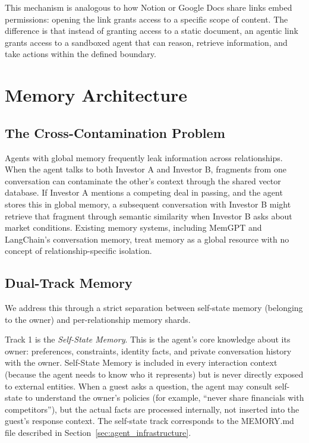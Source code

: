 \documentclass[11pt]{article}
\begin{document}
This mechanism is analogous to how Notion or Google Docs share links embed permissions: opening the link grants access to a specific scope of content. The difference is that instead of granting access to a static document, an agentic link grants access to a sandboxed agent that can reason, retrieve information, and take actions within the defined boundary.


\section{Memory Architecture}
\label{sec:memory_architecture}

\subsection{The Cross-Contamination Problem}

Agents with global memory frequently leak information across relationships. When the agent talks to both Investor A and Investor B, fragments from one conversation can contaminate the other's context through the shared vector database. If Investor A mentions a competing deal in passing, and the agent stores this in global memory, a subsequent conversation with Investor B might retrieve that fragment through semantic similarity when Investor B asks about market conditions. Existing memory systems, including MemGPT and LangChain's conversation memory, treat memory as a global resource with no concept of relationship-specific isolation.

\subsection{Dual-Track Memory}

We address this through a strict separation between self-state memory (belonging to the owner) and per-relationship memory shards.

Track 1 is the \emph{Self-State Memory}. This is the agent's core knowledge about its owner: preferences, constraints, identity facts, and private conversation history with the owner. Self-State Memory is included in every interaction context (because the agent needs to know who it represents) but is never directly exposed to external entities. When a guest asks a question, the agent may consult self-state to understand the owner's policies (for example, ``never share financials with competitors''), but the actual facts are processed internally, not inserted into the guest's response context. The self-state track corresponds to the MEMORY.md file described in Section~\ref{sec:agent_infrastructure}.
\end{document}
